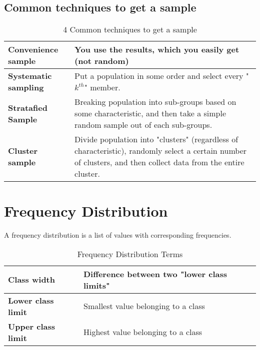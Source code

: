 \documentclass{book}
\begin{document}
\subsection{Common techniques to get a sample}
\begin{table}[htbp]
    \centering
    \caption{4 Common techniques to get a sample}
    \begin{tabular}{>{\bfseries}l p{10cm}}
        \toprule
        Convenience sample & You use the results, which you easily get (not random) \\
        \midrule
        Systematic sampling & Put a population in some order and select every "$k^{th}$" member. \\
        \midrule
        Stratafied Sample & Breaking population into sub-groups based on some
        characteristic, and then take a simple random sample out of each
        sub-groups.\\
        \midrule
        Cluster sample & Divide population into "clusters" (regardless of
        characteristic), randomly select a certain number of clusters, and then
        collect data from the entire cluster.\\
        \bottomrule
    \end{tabular}
    \label{tab:vocab-6}
\end{table}


\section{Frequency Distribution}
A frequency distribution is a list of values with corresponding frequencies.

\begin{table}[htbp]
    \centering
    \begin{tabular}{>{\bfseries}l p{10cm}}
        \toprule
        Class width & Difference between two "lower class limits" \\
        \midrule
        Lower class limit & Smallest value belonging to a class \\
        \midrule
        Upper class limit & Highest value belonging to a class \\
        \bottomrule
    \end{tabular}
    \caption{Frequency Distribution Terms}
\end{table}

\end{document}
